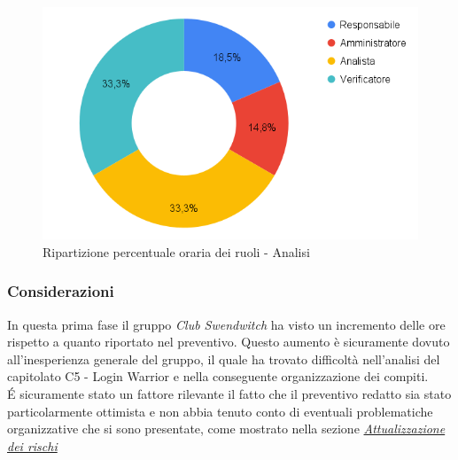 \begin{figure}[h!]
	\centering
	\includegraphics[scale=0.37]{../../assets/Diagrammi_Excel/torta_ore_Analisi.png}
	\caption{Ripartizione percentuale oraria dei ruoli - Analisi}
\end{figure}

\subsubsection{Considerazioni}
In questa prima fase il gruppo \textit{Club Swendwitch} ha visto un incremento delle ore rispetto a quanto riportato nel preventivo. Questo aumento è sicuramente dovuto all'inesperienza generale del gruppo, il quale ha trovato difficoltà nell'analisi del capitolato C5 - Login Warrior e nella conseguente organizzazione dei compiti.\\
\'E sicuramente stato un fattore rilevante il fatto che il preventivo redatto sia stato particolarmente ottimista e non abbia tenuto conto di eventuali problematiche organizzative che si sono presentate, come mostrato nella sezione \hyperref[sec:AttualizzazioneRischi]{\textit{Attualizzazione dei rischi}}

